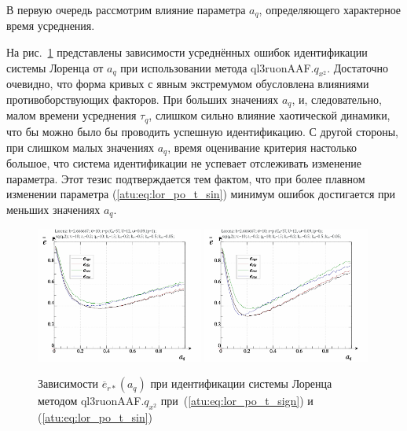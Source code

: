 В первую очередь рассмотрим влияние параметра
$a_q$, определяющего характерное время усреднения.

На рис.~\ref{atu:f:lor_a_q_ql3ruonAAF.q_x2} представлены зависимости
усреднённых ошибок идентификации системы Лоренца от $a_q$ при использовании метода ql3ruonAAF.$q_{x^2}$.
Достаточно очевидно, что форма кривых с явным экстремумом обусловлена
влияниями противоборствующих факторов. При больших значениях $a_q$,
и, следовательно, малом времени усреднения $\tau_q$,
слишком сильно влияние хаотической динамики, что бы можно было бы
проводить успешную идентификацию. С другой стороны,
при слишком малых значениях $a_q$, время оценивание критерия настолько большое,
что система идентификации не успевает отслеживать изменение параметра.
Этот тезис подтверждается тем фактом, что при более плавном изменении параметра
(\ref{atu:eq:lor_po_t_sin})
минимум ошибок достигается при меньших значениях $a_q$.

\begin{figure}[ht!]
  \centerline{
    \includegraphics[width=0.49\textwidth]{p/cha/lor/ql3ruonAAF/lor_ql3ruonAAF_qx2-p_a_q_e_sign.png}
    \hfill
    \includegraphics[width=0.49\textwidth]{p/cha/lor/ql3ruonAAF/lor_ql3ruonAAF_qx2-p_a_q_e_sin.png}
  }
  \caption{Зависимости $\overline{e}_{r*}(a_q)$ при идентификации системы Лоренца методом ql3ruonAAF.$q_{x^2}$
   при~(\ref{atu:eq:lor_po_t_sign}) и (\ref{atu:eq:lor_po_t_sin})}
  \label{atu:f:lor_a_q_ql3ruonAAF.q_x2}
\end{figure}


